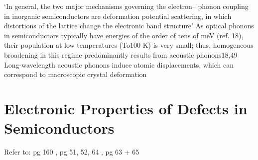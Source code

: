  `In general, the two major mechanisms governing the electron–
phonon coupling in inorganic semiconductors are deformation potential scattering, in which distortions of the lattice change the electronic band structure'
 \cite{MAPI_Eg_broadening}
 As optical phonons in semiconductors typically have energies of the order of tens of meV (ref. 18), their population at low temperatures (To100 K) is very small; thus, homogeneous broadening in this regime predominantly results from acoustic phonons18,49
  \cite{MAPI_Eg_broadening}
  Long-wavelength acoustic phonons induce atomic displacements, which can correspond to macroscopic crystal deformation
   \cite{MAPI_Eg_broadening}


 
\section{Electronic Properties of Defects in Semiconductors}
Refer to: pg 160 \cite{fund_semi}, pg 51, 52, 64 \cite{thin_film_Boer}, pg 63 + 65 \cite{phys_semicond}\\

